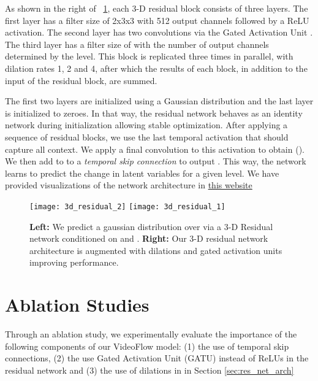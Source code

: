 \documentclass{article} \usepackage{iclr2020_conference,times}
\newcommand{\figref}[1]{\figurename~\ref{#1}}
\begin{document}
As shown in the right of \figref{fig:residual_architecture}, each 3-D residual block consists of three layers. The first layer has a filter size of 2x3x3 with 512 output channels followed by a ReLU activation.
The second layer has two  convolutions via the Gated Activation Unit
\cite{van2016wavenet,van2016conditional}. The third layer has a filter size of  with the number of output channels determined by the level. This block is replicated three times in parallel, with dilation rates 1, 2 and 4, after which the results of each block, in addition to the input of the residual block, are summed. 


The first two layers are initialized using a Gaussian distribution and the last layer is initialized to zeroes. In that way, the residual network behaves as an identity network during initialization allowing stable optimization. After applying a sequence of residual blocks, we use the last temporal activation that should capture all context. We apply a final  convolution to this activation to obtain (). We then add  to  to a \textit{temporal skip connection} to output 
. This way, the network learns to predict the change in latent variables for a given level. We have provided visualizations of the network architecture in \href{https://sites.google.com/corp/view/videoflow/home}{this website}

\begin{figure}
    \hspace{0.1\textwidth}
    \texttt{[image: 3d\_residual\_2]}
    \hspace{0.15\textwidth}
    \texttt{[image: 3d\_residual\_1]}
    \hspace{0.1\textwidth}
    \caption{\textbf{Left:} We predict a gaussian distribution over  via a 3-D Residual network conditioned on  and . \textbf{Right:} Our 3-D residual network architecture is augmented with dilations and gated activation units improving performance.}
    \label{fig:residual_architecture}
\end{figure}

\section{Ablation Studies}
\label{sec:ablations}
Through an ablation study, we experimentally evaluate the importance of the following components of our VideoFlow model: (1) the use of temporal skip connections, (2) the use Gated Activation Unit (GATU) instead of ReLUs in the residual network and (3) the use of dilations in  in Section \ref{sec:res_net_arch}
\end{document}
